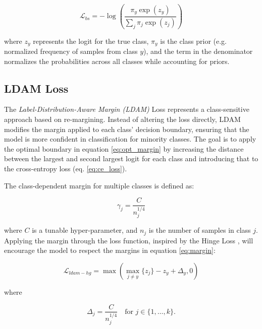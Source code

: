 \begin{equation}
    \mathcal{L}_{bs} = - \log\left( \frac{\pi_y \exp(z_y)}{\sum_j \pi_j \exp(z_j)} \right)
\end{equation}

where $z_y$ represents the logit for the true class, $\pi_y$ is the class prior (e.g. normalized frequency of samples from class $y$), and the term in the denominator normalizes the probabilities across all classes while accounting for priors.




\subsection{LDAM Loss}
\label{sec:ldam_loss}
The \emph{Label-Distribution-Aware Margin (LDAM)} Loss \cite{cao2019learningimbalanceddatasetslabeldistributionaware} represents a class-sensitive approach based on re-margining. Instead of altering the loss directly, LDAM modifies the margin applied to each class' decision boundary, ensuring that the model is more confident in classification for minority classes. The goal is to apply the optimal boundary in equation \eqref{eq:opt_margin} by increasing the distance between the largest and second largest logit for each class and introducing that to the cross-entropy loss (eq. \eqref{eq:ce_loss}).


The class-dependent margin for multiple classes is defined as:

\begin{equation}
    \label{eq:margin}
    \gamma_j = \frac{C}{n^{1/4}_j}
\end{equation}

where $C$ is a tunable hyper-parameter, and $n_j$ is the number of samples in class $j$. Applying the margin through the loss function, inspired by the Hinge Loss \cite{cao2019learningimbalanceddatasetslabeldistributionaware}, will encourage the model to respect the margins in equation \eqref{eq:margin}:

\begin{equation}
    \label{eq:ldam-hg}
    \mathcal{L}_{ldam-hg} = \max\left(\max_{j \neq y}\{z_j\} - z_y + \Delta_y, 0\right)
\end{equation}

\noindent where

\begin{equation}
    \Delta_j = \frac{C}{n_j^{1/4}} \quad \text{for } j \in \{1, \dots, k\}.
\end{equation}

